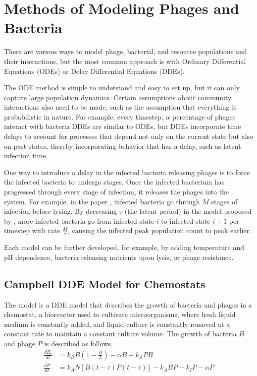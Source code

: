 \section{Methods of Modeling Phages and Bacteria}
There are various ways to model phage, bacterial, and resource populations and their interactions, but the most common approach is with Ordinary Differential Equations (ODEs) or Delay Differential Equations (DDEs). 

The ODE method is simple to understand and easy to set up, but it can only capture large population dynamics.
Certain assumptions about community interactions also need to be made, such as the assumption that everything is probabilistic in nature.
For example, every timestep, $\alpha$ percentage of phages interact with  bacteria
DDEs are similar to ODEs, but DDEs incorporate time delays to account for processes that depend not only on the current state but also on past states, thereby incorporating behavior that has a delay, such as latent infection time. 

One way to introduce a delay in the infected bacteria releasing phages is to force the infected bacteria to undergo stages. 
Once the infected bacterium has progressed through every stage of infection, it releases the phages into the system. 
For example, in the paper \citet{gengUsingBacterialPopulation2024}, infected bacteria go through $M$ stages of infection before lysing. 
By decreasing $\tau$ (the latent period) in the model proposed by \citet{gengUsingBacterialPopulation2024}, more infected bacteria go from infected state $i$ to infected state $i+1$ per timestep with rate $\frac{M}{\tau}$, causing the infected peak population count to peak earlier. 
 
Each model can be further developed, for example, by adding temperature and pH dependence, bacteria releasing nutrients upon lysis, or phage resistance. 

\subsection{Campbell DDE Model for Chemostats}
The \citet{campbellConditionsExistenceBacteriophage1961} model is a DDE model that describes the growth of bacteria and phages in a chemostat, a bioreactor used to cultivate microorganisms, where fresh liquid medium is constantly added, and liquid culture is constantly removed at a constant rate to maintain a constant culture volume. 
The growth of bacteria $B$ and phage $P$ is described as follows. 
\begin{align}
 \frac{d{B}_i}{dt} &= k_B B \left (1 - \frac{B}{L}\right ) -\alpha B - k_A PB \\
 \frac{dP}{dt} &= k_A N \left [B(t-\tau)P(t-\tau) \right ] - k_A BP - k_IP-\alpha P
\end{align}

